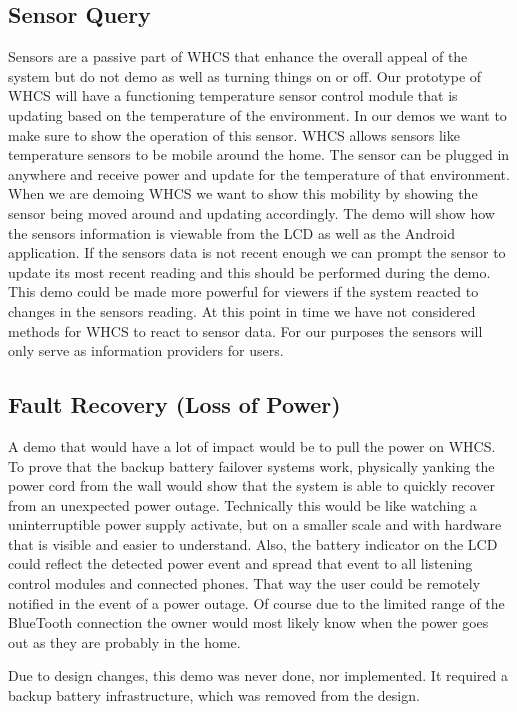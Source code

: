 \subsection{Sensor Query}
Sensors are a passive part of WHCS that enhance the overall appeal of the
system but do not demo as well as turning things on or off. Our prototype of
WHCS will have a functioning temperature sensor control module that is updating
based on the temperature of the environment. In our demos we want to make sure
to show the operation of this sensor.  WHCS allows sensors like temperature
sensors to be mobile around the home. The sensor can be plugged in anywhere and
receive power and update for the temperature of that environment. When we are
demoing WHCS we want to show this mobility by showing the sensor being moved
around and updating accordingly. The demo will show how the sensors information
is viewable from the LCD as well as the Android application. If the sensors
data is not recent enough we can prompt the sensor to update its most recent
reading and this should be performed during the demo. This demo could be made
more powerful for viewers if the system reacted to changes in the sensors
reading. At this point in time we have not considered methods for WHCS to react
to sensor data. For our purposes the sensors will only serve as information
providers for users.

\subsection{Fault Recovery (Loss of Power)}
A demo that would have a lot of impact would be to pull the power on WHCS. To
prove that the backup battery failover systems work, physically yanking the
power cord from the wall would show that the system is able to quickly recover
from an unexpected power outage. Technically this would be like watching a
uninterruptible power supply activate, but on a smaller scale and with hardware
that is visible and easier to understand. Also, the battery indicator on the
LCD could reflect the detected power event and spread that event to all
listening control modules and connected phones. That way the user could be
remotely notified in the event of a power outage. Of course due to the limited
range of the BlueTooth connection the owner would most likely know when the
power goes out as they are probably in the home.

Due to design changes, this demo was never done, nor implemented. It required
a backup battery infrastructure, which was removed from the design.

